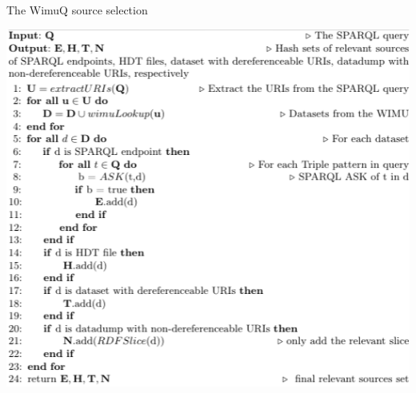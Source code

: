 \begin{algorithm} [H] 
	\caption{The WimuQ source selection}
	\label{alg:iss1}
    \includegraphics[width=\linewidth]{sections/img/algwimuQ.png}
\end{algorithm}

